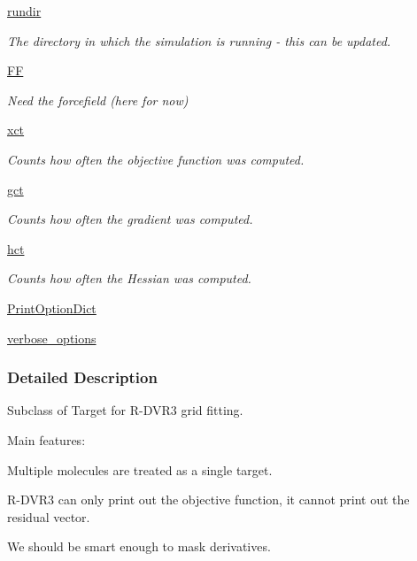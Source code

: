 \begin{DoxyCompactItemize}
\hyperlink{classforcebalance_1_1target_1_1Target_a1da470037ef61c22dc44beb85cfa01a9}{rundir}
\begin{DoxyCompactList}\small\item\em \-The directory in which the simulation is running -\/ this can be updated. \end{DoxyCompactList}\item 
\hyperlink{classforcebalance_1_1target_1_1Target_a796dc30a19a60c63fb43b088d40a963f}{\-F\-F}
\begin{DoxyCompactList}\small\item\em \-Need the forcefield (here for now) \end{DoxyCompactList}\item 
\hyperlink{classforcebalance_1_1target_1_1Target_ad4cd0ab38d8fc97d3e7a6e22ce130a16}{xct}
\begin{DoxyCompactList}\small\item\em \-Counts how often the objective function was computed. \end{DoxyCompactList}\item 
\hyperlink{classforcebalance_1_1target_1_1Target_aff6e42b84dd8eb5a4dc3b47aa58bc64c}{gct}
\begin{DoxyCompactList}\small\item\em \-Counts how often the gradient was computed. \end{DoxyCompactList}\item 
\hyperlink{classforcebalance_1_1target_1_1Target_ae929918b7e695a99d7ec946d06d793e1}{hct}
\begin{DoxyCompactList}\small\item\em \-Counts how often the \-Hessian was computed. \end{DoxyCompactList}\item 
\hyperlink{classforcebalance_1_1BaseClass_afc6659278497d7245bc492ecf405ccae}{\-Print\-Option\-Dict}
\item 
\hyperlink{classforcebalance_1_1BaseClass_afd68efa29ccd2f320f4cf82198214aac}{verbose\-\_\-options}
\end{DoxyCompactItemize}


\subsubsection{\-Detailed \-Description}
\-Subclass of \-Target for \-R-\/\-D\-V\-R3 grid fitting. 

\-Main features\-:
\begin{DoxyItemize}
\item \-Multiple molecules are treated as a single target.
\item \-R-\/\-D\-V\-R3 can only print out the objective function, it cannot print out the residual vector.
\item \-We should be smart enough to mask derivatives. 
\end{DoxyItemize}


